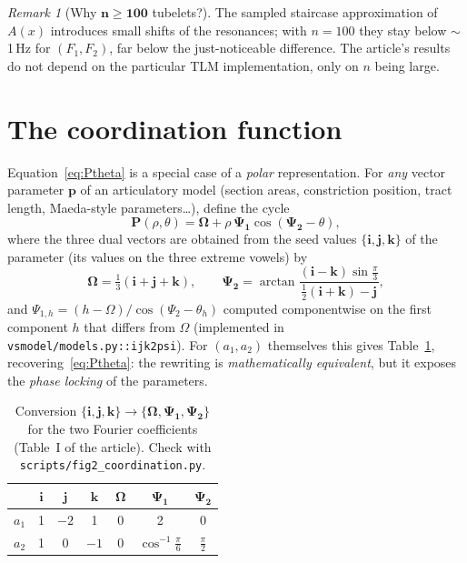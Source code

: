 \documentclass[11pt]{article}
\newcommand{\code}[1]{\texttt{#1}}
\theoremstyle{definition}
\theoremstyle{remark}
\newtheorem{remark}{Remark}
\newcommand{\Fone}{F_1}
\newcommand{\Ftwo}{F_2}
\begin{document}
\begin{remark}[Why $\bm{n\ge100}$ tubelets?]
The sampled staircase approximation of $A(x)$ introduces small shifts of
the resonances; with $n=100$ they stay below $\sim$1\,Hz for
$(\Fone,\Ftwo)$, far below the just-noticeable difference.  The article's
results do not depend on the particular TLM implementation, only on
$n$ being large.
\end{remark}

\section{The coordination function}
\label{sec:coordination}

Equation~\eqref{eq:Ptheta} is a special case of a \emph{polar}
representation.  For \emph{any} vector parameter
$\bm{p}$ of an articulatory model (section areas, constriction position,
tract length, Maeda-style parameters\ldots), define the cycle
\begin{equation}
\bm{P}(\rho,\theta)=\bm{\Omega}+\rho\,\bm{\Psi_1}\cos(\bm{\Psi_2}-\theta),
\label{eq:coord}
\end{equation}
where the three dual vectors are obtained from the seed values
$\{\bm{i},\bm{j},\bm{k}\}$ of the parameter (its values on the three
extreme vowels) by
\begin{equation}
\bm{\Omega}=\tfrac13(\bm{i}+\bm{j}+\bm{k}),\qquad
\bm{\Psi_2}=\arctan\frac{(\bm{i}-\bm{k})\sin\frac{\pi}{3}}
{\frac12(\bm{i}+\bm{k})-\bm{j}},
\label{eq:ijk2psi}
\end{equation}
and $\Psi_{1,h}=(h-\Omega)/\cos(\Psi_2-\theta_h)$ computed componentwise
on the first component $h$ that differs from $\Omega$ (implemented in
\code{vsmodel/models.py::ijk2psi}).  For $(a_1,a_2)$ themselves this
gives Table~\ref{tab:I}, recovering~\eqref{eq:Ptheta}: the rewriting is
\emph{mathematically equivalent}, but it exposes the \emph{phase
locking} of the parameters.

\begin{table}[t]
\centering
\small
\begin{tabular}{lcccccc}
\toprule
 & $\bm{i}$ & $\bm{j}$ & $\bm{k}$ & $\bm{\Omega}$ & $\bm{\Psi_1}$ & $\bm{\Psi_2}$\\
\midrule
$a_1$ & 1 & $-2$ & 1 & 0 & 2 & 0\\
$a_2$ & 1 & 0 & $-1$ & 0 & $\cos^{-1}\frac{\pi}{6}$ & $\frac{\pi}{2}$\\
\bottomrule
\end{tabular}
\caption{Conversion $\{\bm{i},\bm{j},\bm{k}\}\to\{\bm{\Omega},
\bm{\Psi_1},\bm{\Psi_2}\}$ for the two Fourier coefficients (Table~I of
the article).  Check with \code{scripts/fig2\_coordination.py}.}
\label{tab:I}
\end{table}
\end{document}
